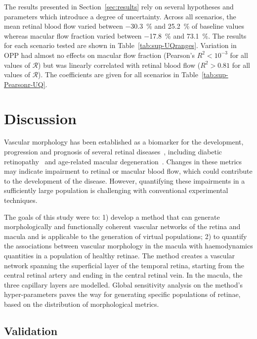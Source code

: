 \documentclass[11pt,]{article}
\begin{document}
The results presented in Section~\ref{sec:results} rely on several hypotheses and parameters which introduce a degree of uncertainty.
Across all scenarios, the mean retinal blood flow varied between \SI{-30.3}{\percent} and \SI{25.2}{\percent} of baseline values whereas macular flow fraction varied between \SI{-17.8}{\percent} and \SI{73.1}{\percent}.
The results for each scenario tested are shown in Table~\ref{tab:sup-UQranges}.
Variation in OPP had almost no effects on macular flow fraction (Pearson's $R^2<10^{-3}$ for all values of $\mathcal R$) but was linearly correlated with retinal blood flow ($R^2>0.81$ for all values of $\mathcal R$).
The coefficients are given for all scenarios in Table~\ref{tab:sup-Pearsonr-UQ}.


\section{Discussion}\label{sec:discussion}

Vascular morphology has been established as a biomarker for the development, progression and prognosis of several retinal diseases~\cite{Balaratnasingam_2023,Yao_2020}, including diabetic retinopathy~\cite{Garg2022,Hein_2023} and age-related macular degeneration~\cite{Told2023,Narnaware_2023}.
Changes in these metrics may indicate impairment to retinal or macular blood flow, which could contribute to the development of the disease. However, quantifying these impairments in a sufficiently large population is challenging with conventional experimental techniques.

The goals of this study were to: 1) develop a method that can generate morphologically and functionally coherent vascular networks of the retina and macula and is applicable to the generation of virtual populations; 2) to quantify the associations between vascular morphology in the macula with haemodynamics quantities in a population of healthy retinae. The method creates a vascular network spanning the superficial layer of the temporal retina, starting from the central retinal artery and ending in the central retinal vein. In the macula, the three capillary layers are modelled. Global sensitivity analysis on the method’s hyper-parameters paves the way for generating specific populations of retinae, based on the distribution of morphological metrics. 

\subsection{Validation}\label{sec:disc-validation}
\end{document}
